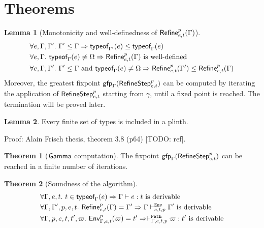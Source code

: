 \documentclass[a4paper]{article}
\theoremstyle{definition}
\newtheorem{theorem}{Theorem}
\newtheorem{lemma}{Lemma}
\begin{document}
  \section{Theorems}

  \begin{lemma}[Monotonicity and well-definedness of $\Refine p {e,t} \Gamma$]
    \begin{align*}
      &\forall e,\Gamma,\Gamma'.\ \Gamma'\leq\Gamma \Rightarrow \tyof e {\Gamma'} \leq \tyof e {\Gamma}\\
      &\forall e,\Gamma.\ \tyof e \Gamma \neq \tsempty \Rightarrow \Refine p {e,t} \Gamma \text{ is well-defined}\\
      &\forall e,\Gamma,\Gamma'.\ \Gamma'\leq\Gamma \text{ and } \tyof e \Gamma \neq \tsempty \Rightarrow \Refine p {e,t} {\Gamma'} \leq \Refine p {e,t} \Gamma\\
    \end{align*}
  Moreover, the greatest fixpoint $\fixpoint_\Gamma (\RefineStep p {e,t})$ can be computed by iterating
  the application of $\RefineStep p {e,t}$ starting from $\gamma$, until a fixed point is reached.
  The termination will be proved later.
  \end{lemma}

  \begin{lemma}
    Every finite set of types is included in a plinth.
  \end{lemma}
  Proof: Alain Frisch thesis, theorem 3.8 (p64) [TODO: ref].

  \begin{theorem}[$\Ga {}$ computation]
    The fixpoint $\fixpoint_\Gamma (\RefineStep p {e,t})$ can be reached in a finite number of iterations.
  \end{theorem}

  \begin{theorem}[Soundness of the algorithm]
    \begin{align*}
      &\forall \Gamma, e, t.\ t\in\tyof e \Gamma \Rightarrow \Gamma \vdash e:t\text{ is derivable}\\
      &\forall \Gamma, \Gamma', p, e, t.\ \Refine p {e,t} \Gamma = \Gamma' \Rightarrow \Gamma \evdash p e t \Gamma' \text{ is derivable}\\
      &\forall \Gamma, p, e, t, t', \varpi.\ \Gp p {\Gamma,e,t} (\varpi) = t' \Rightarrow \pvdash \Gamma p e t \varpi:t' \text{ is derivable}
    \end{align*}
  \end{theorem}
\end{document}

